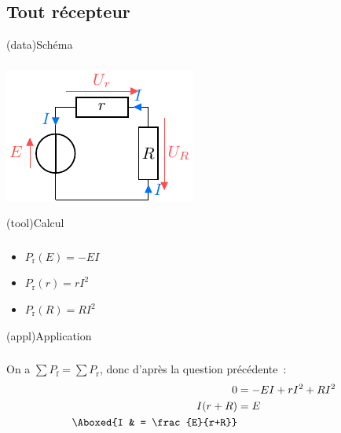 \documentclass[../../main/main.tex]{subfiles}
\begin{document}
{\subsection{Tout récepteur}
\begin{tcbraster}[raster columns=7, raster equal height=rows]
    \begin{tcb}[raster multicolumn=2](data){Schéma}
        \subsubsection{}
        \vfill
        \begin{center}
            \includegraphics{convs_a}
        \end{center}
        \vfill
    \end{tcb}
    \begin{tcb}[raster multicolumn=2](tool){Calcul}
        \subsubsection{}
        \vfill
        \begin{itemize}[leftmargin=20pt]
            \item $P_{\text{r}}(E) = -EI$
            \item $P_{\text{r}}(r) = rI^2$
            \item $P_{\text{r}}(R) = RI^2$
        \end{itemize}
        \vfill
    \end{tcb}
    \begin{tcb}[raster multicolumn=3](appl){Application}
        \subsubsection{}
        On a $\sum P_{\text{f}} = \sum P_{\text{r}}$, donc d'après
        la question précédente~:
        \begin{align*}
            0         & = -EI + rI^2 + RI^2\\
            I(r+R)    & = E\\
            \Aboxed{I & = \frac{E}{r+R}}
        \end{align*}
    \end{tcb}
\end{tcbraster}

}
\end{document}
